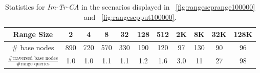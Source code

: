 \documentclass[a4paper,UKenglish]{oasics-v2016}
\begin{document}
 \begin{table}[h]\footnotesize  
  \caption{Statistics for \emph{Im-Tr-CA} in the scenarios displayed in \figurename~\ref{fig:rangeseprange100000} and \figurename~\ref{fig:rangesepput100000}.\label{tab:nodestats100000}}
      \begin{tabular}{c|cccccccccc} %
      Range Size  & 2 & 4 & 8 & 32 & 128 & 512 & 2K & 8K & 32K & 128K \\\hline
      \# base nodes & 890 & 720 & 570 & 330 & 190 & 120 & 97 & 130 & 90 & 96 \\ 
      $\frac{\text{\# traversed base nodes}}{\text{\# range queries}}$ & 1.0 & 1.0 & 1.1 & 1.1 & 1.2 & 1.6 & 3.0 & 11 & 27 & 98 \\ %
    \end{tabular}
 \end{table}
\end{document}
